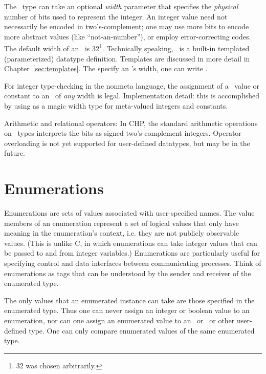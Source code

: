The \int\ type can take an optional \emph{width} parameter that specifies
the \emph{physical} number of bits used to represent the integer.  
An integer value need not necessarily be encoded in two's-complement; 
one may use more bits to encode more abstract values (like ``not-an-number''), 
or employ error-correcting codes.  
The default width of an \int\ is 32\footnote{32 was chosen arbitrarily.}.
Technically speaking, \int\ is a built-in templated (parameterized) 
datatype definition.  
Templates are discussed in more detail in Chapter~\ref{sec:templates}.  
The specify an \int's width, one can write \ttt{>}.  

For integer type-checking in the nonmeta language, 
the assignment of a \pint\ value or constant to an \int\ of
\emph{any} width is legal.  
Implementation detail: this is accomplished by using 
as a magic width type for meta-valued integers and constants.  

Arithmetic and relational operators:
In CHP, the standard arithmetic operations on \int\ types interprets
the bits as signed two's-complement integers.  
Operator overloading is not yet supported for user-defined datatypes, 
but may be in the future.  


\section{Enumerations}
\label{sec:datatype:enum}

Enumerations are sets of values associated with user-specified names.  
The value members of an enumeration represent a set of 
logical values that only have meaning in the enumeration's context, 
i.e. they are not publicly observable values.  
(This is unlike C, in which enumerations can take integer values that 
can be passed to and from integer variables.)
Enumerations are particularly useful for specifying 
control and data interfaces between communicating processes.  
Think of enumerations as tags that can be understood by 
the sender and receiver of the enumerated type.  

The only values that an enumerated instance can take are 
those specified in the enumerated type.  
Thus one can never assign an integer or boolean value to an enumeration, 
nor can one assign an enumerated value to an \int\ or \bool\ or
other user-defined type.  
One can only compare enumerated values of the same enumerated type.  

